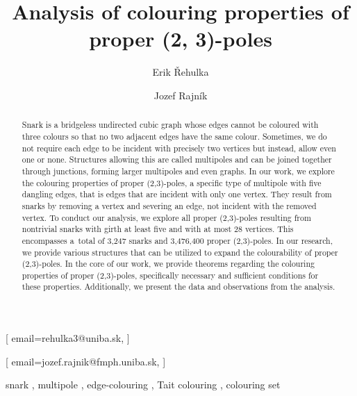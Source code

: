 \documentclass[
twocolumn,
]{ceurart}
\begin{document}


\title{Analysis of colouring properties of proper (2, 3)-poles}


\author[1]{Erik Řehulka}[%
email=rehulka3@uniba.sk,
]
\address[1]{Comenius University, Mlynská dolina, 842 48 Bratislava, Slovakia}

\author[1]{Jozef Rajník}[%
email=jozef.rajnik@fmph.uniba.sk,
]

\begin{abstract}
  Snark is a bridgeless undirected cubic graph whose edges cannot be coloured with three colours so that no two adjacent edges have the same colour. Sometimes, we do not require each edge to be incident with precisely two vertices but instead, allow even one or none. Structures allowing this are called multipoles and can be joined together through junctions, forming larger multipoles and even graphs. In our work, we explore the colouring properties of proper (2,3)-poles, a specific type of multipole with five dangling edges, that is edges that are incident with only one vertex. They result from snarks by removing a vertex and severing an edge, not incident with the removed vertex. To conduct our analysis, we explore all proper (2,3)-poles resulting from nontrivial snarks with girth at least five and with at most 28 vertices. This encompasses a~total of 3,247 snarks and 3,476,400 proper (2,3)-poles. In our research, we provide various structures that can be utilized to expand the colourability of proper (2,3)-poles. In the core of our work, we provide theorems regarding the colouring properties of proper (2,3)-poles, specifically necessary and sufficient conditions for these properties. Additionally, we present the data and observations from the analysis.
\end{abstract}

\begin{keywords}
	snark \sep 
	multipole \sep 
	edge-colouring \sep 
	Tait colouring \sep 
	colouring set
\end{keywords}
\end{document}
